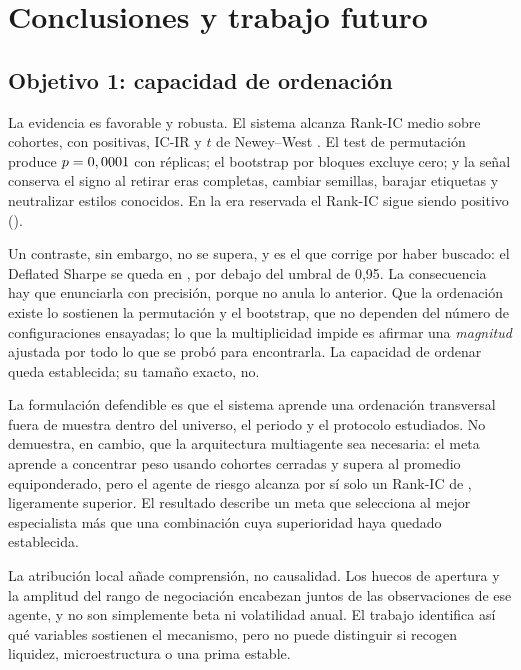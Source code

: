 \chapter{Conclusiones y trabajo futuro}
\label{chap:conclusiones}

\section{Objetivo 1: capacidad de ordenación}

La evidencia es favorable y robusta. El sistema alcanza Rank-IC medio \RankICSeleccion{} sobre
\CohortesSeleccion{} cohortes, con \FraccionICPositiva{} positivas, IC-IR \ICIRSeleccion{} y $t$ de
Newey--West \TNeweyWest{}. El test de permutación produce $p=0,0001{}$ con
\NumPermutaciones{} réplicas; el bootstrap por bloques excluye cero; y la señal conserva el signo al
retirar eras completas, cambiar semillas, barajar etiquetas y neutralizar estilos conocidos. En la
era reservada el Rank-IC sigue siendo positivo (\RankICReservado{}).

Un contraste, sin embargo, no se supera, y es el que corrige por haber buscado: el Deflated Sharpe
se queda en \ProbabilidadDSR{}, por debajo del umbral de 0,95. La consecuencia hay que enunciarla
con precisión, porque no anula lo anterior. Que la ordenación existe lo sostienen la permutación y
el bootstrap, que no dependen del número de configuraciones ensayadas; lo que la multiplicidad
impide es afirmar una \emph{magnitud} ajustada por todo lo que se probó para encontrarla. La
capacidad de ordenar queda establecida; su tamaño exacto, no.

La formulación defendible es que el sistema aprende una ordenación transversal fuera de muestra
dentro del universo, el periodo y el protocolo estudiados. No demuestra, en cambio, que la
arquitectura multiagente sea necesaria: el meta aprende a concentrar peso usando cohortes cerradas y
supera al promedio equiponderado, pero el agente de riesgo alcanza por sí solo un Rank-IC de
\RankICRisk{}, ligeramente superior. El resultado describe un meta que selecciona al mejor
especialista más que una combinación cuya superioridad haya quedado establecida.

La atribución local añade comprensión, no causalidad. Los huecos de apertura y la amplitud del rango
de negociación encabezan juntos \DosVariablesRisk{} de las observaciones de ese agente, y no son
simplemente beta ni volatilidad anual. El trabajo identifica así qué variables sostienen el
mecanismo, pero no puede distinguir si recogen liquidez, microestructura o una prima estable.

